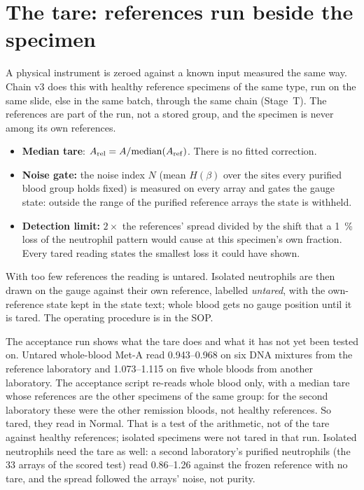 \section{The tare: references run beside the specimen}

A physical instrument is zeroed against a known input measured the same way. Chain v3 does this with healthy reference specimens of the same
type, run on the same slide, else in the same batch, through the same chain (Stage~T). The
references are part of the run, not a stored group, and the specimen is never among its own references.
\begin{itemize}
\item \textbf{Median tare}: $A_{\rm rel}=A/\mathrm{median}(A_{\rm ref})$. There is no fitted correction.
\item \textbf{Noise gate:} the noise index $N$ (mean $H(\beta)$ over the sites every purified blood group holds fixed) is measured on
      every array and gates the gauge state: outside the range of the purified reference arrays the state is withheld.
\item \textbf{Detection limit:} $2\times$ the references' spread divided by the shift that a 1~\% loss of the neutrophil pattern would cause at this
      specimen's own fraction. Every tared reading states the smallest loss it could have shown.
\end{itemize}
With too few references the reading is untared. Isolated neutrophils are then drawn on the gauge against their own reference,
labelled \emph{untared}, with the own-reference state kept in the state text; whole blood gets no gauge position until it is tared.
The operating procedure is in the SOP.

The acceptance run shows what the tare does and what it has not yet been tested on. Untared whole-blood Met-A read 0.943--0.968 on six DNA mixtures from the reference laboratory and 1.073--1.115 on
five whole bloods from another laboratory. The acceptance script re-reads whole blood only, with a median tare whose references are the other
specimens of the same group: for the second laboratory these were the other remission bloods, not healthy references. So tared, they read
in Normal. \measured{} That is a test of the arithmetic, not of the tare against healthy references; isolated
specimens were not tared in that run. Isolated neutrophils need the tare as well: a second laboratory's purified neutrophils (the 33 arrays of the scored test) read 0.86--1.26
against the frozen reference with no tare, and the spread followed the arrays' noise, not purity. \measured

